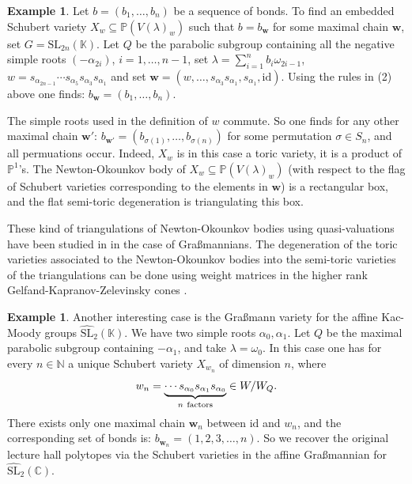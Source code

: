 \documentclass[12pt, a4paper]{amsart}   	%
\numberwithin{equation}{section}
\theoremstyle{plain}
\theoremstyle{definition}
\newtheorem{example}[theorem]{Example}
\begin{document}
\begin{example}\rm
Let $b=(b_1,\ldots,b_n)$ be a sequence of bonds. To find an embedded Schubert variety $X_w\subseteq \mathbb P(V(\lambda)_w)$ 
such that $b=b_\mathbf w$ for some maximal chain $\mathbf w$, set $G=\mathrm{SL}_{2n}(\mathbb K)$. 
Let $Q$ be the parabolic subgroup containing all the negative simple roots $(-\alpha_{2i})$, $i=1,\ldots,n-1$, set 
$\lambda=\sum_{i=1}^n b_i\omega_{2i-1}$, $w=s_{\alpha_{2n-1}}\cdots s_{\alpha_5}s_{\alpha_3}s_{\alpha_1}$
and set $\mathbf w=(w,\ldots,s_{\alpha_3}s_{\alpha_1}, s_{\alpha_1},\mathrm{id})$. Using the rules in (2) above one finds: $b_\mathbf w=(b_1,\ldots,b_n)$.

The simple roots used in the definition of $w$ commute. So one finds for any 
other maximal chain $\mathbf w'$: $b_{\mathbf w'}=(b_{\sigma(1)},\ldots,b_{\sigma(n)})$ for some permutation $\sigma\in S_n$,
and all permuations occur. Indeed, $X_w$ is in this case 
a toric variety, it is a product of $\mathbb P^1$'s. The Newton-Okounkov body of $X_w\subseteq \mathbb P(V(\lambda)_w)$ 
(with respect to the flag of Schubert varieties corresponding to the elements in $\mathbf w$)
is a rectangular box, and the flat semi-toric degeneration is triangulating this box. 

These kind of triangulations of Newton-Okounkov bodies using quasi-valuations have been studied in \cite[Section 7]{FL} in the case of Gra\ss mannians. The degeneration of the toric varieties associated to the Newton-Okounkov bodies into the semi-toric varieties of the triangulations can be done using weight matrices in the higher rank Gelfand-Kapranov-Zelevinsky cones \cite{CCFL}.
\end{example}
\begin{example}\rm
Another interesting case is the Gra\ss mann variety for the affine Kac-Moody groups $\widehat{\mathrm{SL}}_2(\mathbb K)$. We have two simple roots 
$\alpha_0,\alpha_1$. Let $Q$ be the maximal parabolic subgroup containing $-\alpha_1$,
and take $\lambda=\omega_0$. In this case one has for every $n\in \mathbb N$ a unique Schubert variety $X_{w_n}$
of dimension $n$, where 
$$
w_n=\underbrace{\cdots s_{\alpha_0}s_{\alpha_1}s_{\alpha_0}}_{n\ {\rm factors}} \in W/W_Q.
$$
There exists only
one maximal chain $\mathbf w_n$ between $\mathrm{id}$ and $w_n$, and the corresponding set of bonds is: 
$b_{\mathbf w_n}=(1,2,3,\ldots,n)$. So we recover the original lecture hall polytopes via the Schubert varieties in the affine Gra\ss mannian for $\widehat{\mathrm{SL}}_2(\mathbb C)$.
\end{example}
\end{document}
